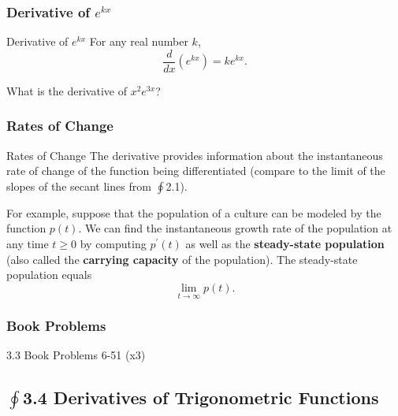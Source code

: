 \documentclass[cal1spr16Lectures.tex]{subfiles}
\begin{document}
\subsubsection{Derivative of $e^{kx}$}

\begin{frame}{\small Derivative of $e^{kx}$}
For any real number $k$,
\[\frac{d}{dx} \left( e^{kx} \right) = ke^{kx}.\]
\begin{exe}What is the derivative of $x^2 e^{3x}$? \end{exe}
\end{frame}

\subsubsection{Rates of Change}

\begin{frame}{\small Rates of Change}\footnotesize
The derivative provides information about the instantaneous rate of change of the function being differentiated (compare to the limit of the slopes of the secant lines from $\textstyle\oint$2.1).

\vspace{1pc}
For example, suppose that the population of a culture can be modeled by the function $p(t)$.  We can find the instantaneous growth rate of the population at any time $t \ge 0$ by computing $p^{\prime}(t)$ as well as the \alert{\bf steady-state population} (also called the {\bf carrying capacity} of the population).  The steady-state population equals 
\[\lim_{t \to \infty} p(t).\]
\end{frame}

\subsubsection{Book Problems}

\begin{frame}{}
\begin{block}{3.3 Book Problems} 6-51 (x3) \end{block} 
\end{frame}

\subsection[3.4 Derivatives of Trigonometric Functions]{$\textstyle\oint$3.4 Derivatives of Trigonometric Functions}
\end{document}
